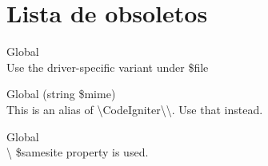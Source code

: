 \chapter{Lista de obsoletos}
\hypertarget{deprecated}{}\label{deprecated}

\begin{DoxyRefList}
\item[Global \doxylink{class_config_1_1_cache_aa2e3217e9d03bf737e5b4fe147a46c4b}{Cache\+::\$store\+Path} ]\hfill \\
\label{deprecated__deprecated000001}%
%
Use the driver-\/specific variant under \$file  
\item[Global \doxylink{class_config_1_1_format_ac6341d2788904fc2d43d12853fa22f78}{Format\+::get\+Formatter} (string \$mime)]\hfill \\
\label{deprecated__deprecated000005}%
%
This is an alias of {\ttfamily \textbackslash{}Code\+Igniter\textbackslash{}\textbackslash{}}. Use that instead.  
\item[Global \doxylink{class_config_1_1_security_a98b5333262f996cc9220f222ebc3c2cb}{Security\+::\$samesite} ]\hfill \\
\label{deprecated__deprecated000006}%
%
{\ttfamily {}\textbackslash{}} \$samesite property is used. 
\end{DoxyRefList}